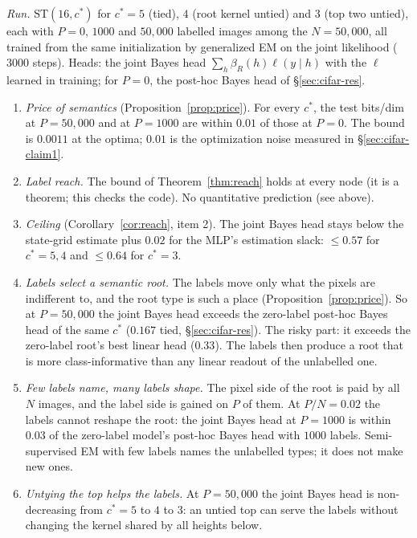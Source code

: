 \documentclass[11pt]{article}
\theoremstyle{definition}
\begin{document}
\emph{Run.} $\mathrm{ST}(16,c^*)$ for $c^*=5$ (tied), $4$ (root kernel untied) and $3$ (top two untied), each with
$P=0$, $1000$ and $50{,}000$ labelled images among the $N=50{,}000$, all trained from the same initialization by
generalized EM on the joint likelihood ($3000$ steps). Heads: the joint Bayes head $\sum_h\beta_R(h)\ell(y\mid h)$
with the $\ell$ learned in training; for $P=0$, the post-hoc Bayes head of \S\ref{sec:cifar-res}.
\begin{enumerate}
\item[(S1)] \emph{Price of semantics} (Proposition~\ref{prop:price}). For every $c^*$, the test bits/dim at $P=50{,}000$
and at $P=1000$ are within $0.01$ of those at $P=0$. The bound is $0.0011$ at the optima; $0.01$ is the
optimization noise measured in \S\ref{sec:cifar-claim1}.
\item[(S2)] \emph{Label reach.} The bound of Theorem~\ref{thm:reach} holds at every node (it is a theorem; this checks
the code). No quantitative prediction (see above).
\item[(S3)] \emph{Ceiling} (Corollary~\ref{cor:reach}, item 2). The joint Bayes head stays below the state-grid
estimate plus $0.02$ for the MLP's estimation slack: $\le0.57$ for $c^*=5,4$ and $\le0.64$ for $c^*=3$.
\item[(S4)] \emph{Labels select a semantic root.} The labels move only what the pixels are indifferent to, and the root
type is such a place (Proposition~\ref{prop:price}). So at $P=50{,}000$ the joint Bayes head exceeds the zero-label
post-hoc Bayes head of the same $c^*$ ($0.167$ tied, \S\ref{sec:cifar-res}). The risky part: it exceeds the
zero-label root's best linear head ($0.33$). The labels then produce a root that is more class-informative than any
linear readout of the unlabelled one.
\item[(S5)] \emph{Few labels name, many labels shape.} The pixel side of the root is paid by all $N$ images, and the
label side is gained on $P$ of them. At $P/N=0.02$ the labels cannot reshape the root: the joint Bayes head at $P=1000$
is within $0.03$ of the zero-label model's post-hoc Bayes head with $1000$ labels. Semi-supervised EM with few
labels names the unlabelled types; it does not make new ones.
\item[(S6)] \emph{Untying the top helps the labels.} At $P=50{,}000$ the joint Bayes head is non-decreasing from $c^*=5$
to $4$ to $3$: an untied top can serve the labels without changing the kernel shared by all heights below.
\end{enumerate}
\end{document}
